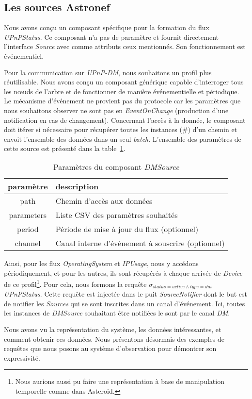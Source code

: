 \subsection{Les sources Astronef}
Nous avons conçu un composant spécifique pour la formation du flux \textit{UPnPStatus}. Ce composant n'a pas de paramètre et fournit directement l'interface \textit{Source} avec comme attributs ceux mentionnés. Son fonctionnement est événementiel.

Pour la communication sur \textit{UPnP-DM}, nous souhaitons un profil plus réutilisable. Nous avons conçu un composant générique capable d'interroger tous les nœuds de l'arbre et de fonctionner de manière événementielle et périodique. Le mécanisme d'événement ne provient pas du protocole car les paramètres que nous souhaitons observer ne sont pas en \textit{EventOnChange} (production d'une notification en cas de changement). Concernant l'accès à la donnée, le composant doit itérer si nécessaire pour récupérer toutes les instances (\#) d'un chemin et envoit l'ensemble des données dans un seul \textit{batch}. L'ensemble des paramètres de cette source est présenté dans la table~\ref{tab:valid:domvision:dmsource}.

\begin{table}[ht]
    \centering
    \begin{tabular}{cl}
        paramètre & description \\ \midrule
        path & Chemin d'accès aux données \\
        parameters & Liste CSV des paramètres souhaités \\
        period & Période de mise à jour du flux (optionnel) \\
        channel & Canal interne d'événement à souscrire (optionnel)
    \end{tabular}
    \caption{Paramètres du composant \textit{DMSource}}\label{tab:valid:domvision:dmsource}
\end{table}

Ainsi, pour les flux \textit{OperatingSystem} et \textit{IPUsage}, nous y accédons périodiquement, et pour les autres, ils sont récupérés à chaque arrivée de \textit{Device} de ce profil\footnote{Nous aurions aussi pu faire une représentation à base de manipulation temporelle comme dans Asteroid.}. Pour cela, nous formons la requête $\sigma_{status=active\wedge type=dm}$ \textit{UPnPStatus}. Cette requête est injectée dans le puit \textit{SourceNotifier} dont le but est de notifier les \textit{Sources} qui se sont inscrites dans un canal d'événement. Ici, toutes les instances de \textit{DMSource} souhaitant être notifiées le sont par le canal \textit{DM}.

Nous avons vu la représentation du système, les données intéressantes, et comment obtenir ces données. Nous présentons désormais des exemples de requêtes que nous posons au système d'observation pour démontrer son expressivité.